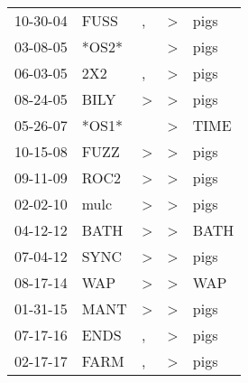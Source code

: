 \begin{supertabular}{lllll}
 10-30-04 &   FUSS &             , &  \textgreater &  pigs \\
 03-08-05 &  *OS2* &               &  \textgreater &  pigs \\
 06-03-05 &    2X2 &             , &  \textgreater &  pigs \\
 08-24-05 &   BILY &  \textgreater &  \textgreater &  pigs \\
 05-26-07 &  *OS1* &               &  \textgreater &  TIME \\
 10-15-08 &   FUZZ &  \textgreater &  \textgreater &  pigs \\
 09-11-09 &   ROC2 &  \textgreater &  \textgreater &  pigs \\
 02-02-10 &   mulc &  \textgreater &  \textgreater &  pigs \\
 04-12-12 &   BATH &  \textgreater &  \textgreater &  BATH \\
 07-04-12 &   SYNC &  \textgreater &  \textgreater &  pigs \\
 08-17-14 &    WAP &  \textgreater &  \textgreater &   WAP \\
 01-31-15 &   MANT &  \textgreater &  \textgreater &  pigs \\
 07-17-16 &   ENDS &             , &  \textgreater &  pigs \\
 02-17-17 &   FARM &             , &  \textgreater &  pigs \\
\end{supertabular}
